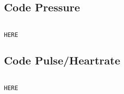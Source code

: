 \subsection{Code Pressure}
\begin{lstlisting}[language=c,frame=tb,caption={Code Pressure},label=lst:codepressure]

HERE
\end{lstlisting}

\subsection{Code Pulse/Heartrate}
\begin{lstlisting}[language=c,frame=tb,caption={Code Pulse/Heartrate},label=lst:codepulse]

HERE
\end{lstlisting}




